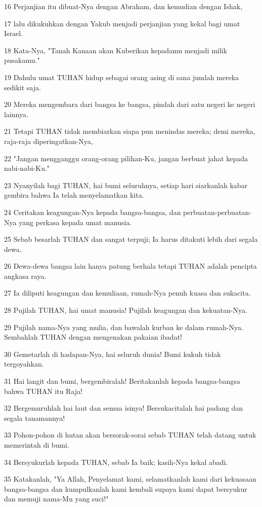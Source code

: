 \par 16 Perjanjian itu dibuat-Nya dengan Abraham, dan kemudian dengan Ishak,
\par 17 lalu dikukuhkan dengan Yakub menjadi perjanjian yang kekal bagi umat Israel.
\par 18 Kata-Nya, "Tanah Kanaan akan Kuberikan kepadamu menjadi milik pusakamu."
\par 19 Dahulu umat TUHAN hidup sebagai orang asing di sana jumlah mereka sedikit saja.
\par 20 Mereka mengembara dari bangsa ke bangsa, pindah dari satu negeri ke negeri lainnya.
\par 21 Tetapi TUHAN tidak membiarkan siapa pun menindas mereka; demi mereka, raja-raja diperingatkan-Nya,
\par 22 "Jangan mengganggu orang-orang pilihan-Ku, jangan berbuat jahat kepada nabi-nabi-Ku."
\par 23 Nyanyilah bagi TUHAN, hai bumi seluruhnya, setiap hari siarkanlah kabar gembira bahwa Ia telah menyelamatkan kita.
\par 24 Ceritakan keagungan-Nya kepada bangsa-bangsa, dan perbuatan-perbuatan-Nya yang perkasa kepada umat manusia.
\par 25 Sebab besarlah TUHAN dan sangat terpuji; Ia harus ditakuti lebih dari segala dewa.
\par 26 Dewa-dewa bangsa lain hanya patung berhala tetapi TUHAN adalah pencipta angkasa raya.
\par 27 Ia diliputi keagungan dan kemuliaan, rumah-Nya penuh kuasa dan sukacita.
\par 28 Pujilah TUHAN, hai umat manusia! Pujilah keagungan dan kekuatan-Nya.
\par 29 Pujilah nama-Nya yang mulia, dan bawalah kurban ke dalam rumah-Nya. Sembahlah TUHAN dengan mengenakan pakaian ibadat!
\par 30 Gemetarlah di hadapan-Nya, hai seluruh dunia! Bumi kukuh tidak tergoyahkan.
\par 31 Hai langit dan bumi, bergembiralah! Beritakanlah kepada bangsa-bangsa bahwa TUHAN itu Raja!
\par 32 Bergemuruhlah hai laut dan semua isinya! Bersukacitalah hai padang dan segala tanamannya!
\par 33 Pohon-pohon di hutan akan bersorak-sorai sebab TUHAN telah datang untuk memerintah di bumi.
\par 34 Bersyukurlah kepada TUHAN, sebab Ia baik; kasih-Nya kekal abadi.
\par 35 Katakanlah, "Ya Allah, Penyelamat kami, selamatkanlah kami dari kekuasaan bangsa-bangsa dan kumpulkanlah kami kembali supaya kami dapat bersyukur dan memuji nama-Mu yang suci!"

